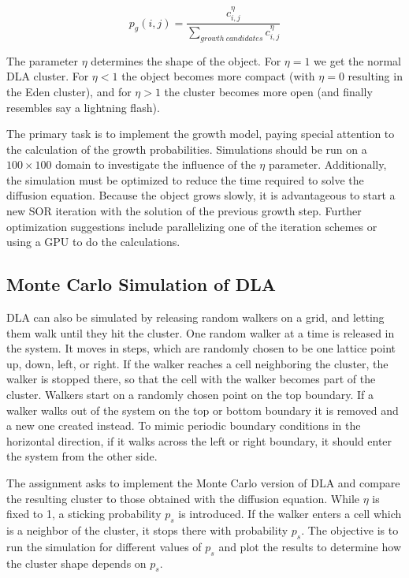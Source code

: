 \documentclass[10pt, journal]{IEEEtran}
\begin{document}
\begin{equation}
p_{g}(i,j)=\frac{c_{i,j}^{\eta}}{\sum_{growth~candidates}c_{i,j}^{\eta}}
\end{equation}

The parameter $\eta$ determines the shape of the object. For $\eta=1$ we get the normal DLA cluster. For $\eta<1$ the object becomes more compact (with $\eta=0$ resulting in the Eden cluster), and for $\eta>1$ the cluster becomes more open (and finally resembles say a lightning flash). 

The primary task is to implement the growth model, paying special attention to the calculation of the growth probabilities. Simulations should be run on a $100\times100$ domain to investigate the influence of the $\eta$ parameter. Additionally, the simulation must be optimized to reduce the time required to solve the diffusion equation. Because the object grows slowly, it is advantageous to start a new SOR iteration with the solution of the previous growth step. Further optimization suggestions include parallelizing one of the iteration schemes or using a GPU to do the calculations.

\subsection{Monte Carlo Simulation of DLA}

DLA can also be simulated by releasing random walkers on a grid, and letting them walk until they hit the cluster. One random walker at a time is released in the system. It moves in steps, which are randomly chosen to be one lattice point up, down, left, or right. If the walker reaches a cell neighboring the cluster, the walker is stopped there, so that the cell with the walker becomes part of the cluster. Walkers start on a randomly chosen point on the top boundary. If a walker walks out of the system on the top or bottom boundary it is removed and a new one created instead. To mimic periodic boundary conditions in the horizontal direction, if it walks across the left or right boundary, it should enter the system from the other side. 

The assignment asks to implement the Monte Carlo version of DLA and compare the resulting cluster to those obtained with the diffusion equation. While $\eta$ is fixed to 1, a sticking probability $p_{s}$ is introduced. If the walker enters a cell which is a neighbor of the cluster, it stops there with probability $p_{s}$. The objective is to run the simulation for different values of $p_{s}$ and plot the results to determine how the cluster shape depends on $p_{s}$.
\end{document}
